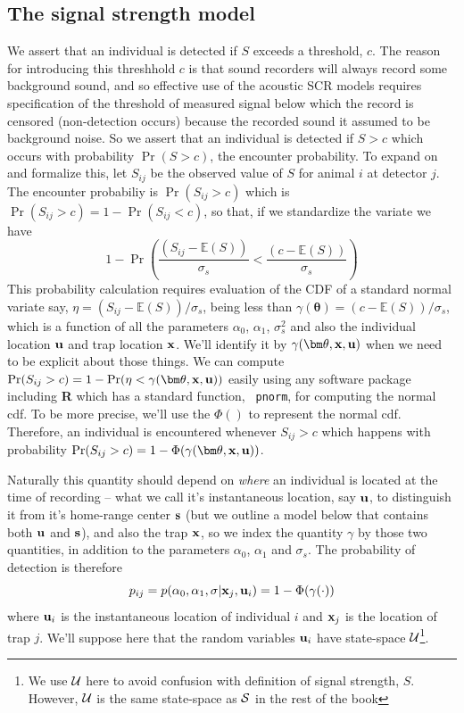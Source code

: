 \subsection{The signal strength model}

We assert that an individual is detected if $S$ exceeds a threshold,
$c$. The reason for introducing this threshhold $c$ is that sound
recorders will always record some
background 
sound, and so effective use of the
acoustic SCR models requires specification of the threshold of
measured signal below which the record is censored (non-detection
occurs) because the recorded sound it assumed to be background noise.
So we assert that an individual is detected if $S>c$ which occurs with
probability $\Pr(S > c)$, the encounter probability.  To expand on and
formalize this, let $S_{ij}$ be the observed value of $S$ for animal $i$ at
detector $j$.  The encounter probabiliy is $\Pr(S_{ij}>c)$ which is
$\Pr(S_{ij}>c) = 1- \Pr(S_{ij} < c)$, so that, if we standardize the
variate we have
\[
1-\Pr\left( \frac{ (S_{ij}- \mathbb{E}(S))}{\sigma_{s}}  <  \frac{
(c -  \mathbb{E}(S)) }{\sigma_{s}} \right)
\]
This probability %
calculation requires evaluation of the CDF  of a standard normal variate
say, $\eta = (S_{ij}- \mathbb{E}(S))/\sigma_{s}$, being
less than 
$\gamma({\bm \theta}) = (c -  \mathbb{E}(S))/\sigma_{s}$, 
which is a function of all the parameters $\alpha_{0}$, $\alpha_{1}$,
$\sigma_{s}^{2}$ and also the individual location ${\bf u}$ and trap location
${\bf x}$.
We'll identify it by
$\gamma({\bm \theta},{\bf x},{\bf u})$ when we need to be explicit
about those things.
 We can compute
$\Pr(S_{ij}>c) = 1-\Pr(  \eta <
\gamma({\bm \theta}, {\bf x},{\bf u}))$ easily using any software
package including {\bf R} which has a standard function, \mbox{\tt
  pnorm}, for computing the normal cdf.
To be more precise, we'll use the $\Phi()$ to represent the normal
cdf. Therefore, an individual is encountered whenever $S_{ij}>c$ which
happens with probability
$\Pr(S_{ij}>c) = 1-\Phi( \gamma({\bm \theta}, {\bf x},{\bf u}) )$.

Naturally this quantity should depend on {\it where} an individual is
located at the time of recording
-- what we call it's instantaneous location, say ${\bf u}$, to
distinguish it from it's
 home-range center ${\bf s}$ (but we outline a model below that
 contains both ${\bf u}$ and ${\bf s}$),
and also the trap ${\bf x}$, so we
 index the quantity $\gamma$ by those two quantities, in
addition to the parameters $\alpha_{0}$, $\alpha_{1}$ and $\sigma_{s}$.
The probability of detection is therefore
\[
p_{ij} = p(\alpha_0, \alpha_1, \sigma | {\bf x}_{j}, {\bf u}_{i} ) = 1- \Phi( \gamma(\cdot))
\]
where
 ${\bf u}_{i}$ is the instantaneous location of individual $i$ and
${\bf x}_{j}$ is the location of trap $j$.  We'll suppose here that
the random variables ${\bf u}_{i}$ have state-space ${\cal
  U}$\footnote{We use ${\cal U}$ here to avoid confusion with
  definition of signal strength, $S$. However, ${\cal U}$ is the same
  state-space as ${\cal S}$ in the rest of the book}.

